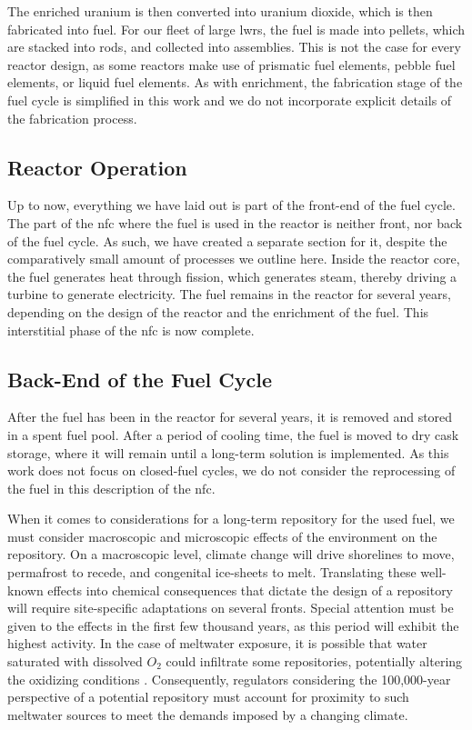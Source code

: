 The enriched uranium is then converted into uranium dioxide, which is then fabricated into fuel. For our fleet of large \glspl{lwr}, the fuel is made into pellets, which are stacked into rods, and collected into assemblies. This is not the case for every reactor design, as some reactors make use of prismatic fuel elements, pebble fuel elements, or liquid fuel elements. As with enrichment, the fabrication stage of the fuel cycle is simplified in this work and we do not incorporate explicit details of the fabrication process.

\subsection{Reactor Operation}
\label{sec:reactor_operation}
Up to now, everything we have laid out is part of the front-end of the fuel cycle. The part of the \gls{nfc} where the fuel is used in the reactor is neither front, nor back of the fuel cycle. As such, we have created a separate section for it, despite the comparatively small amount of processes we outline here. Inside the reactor core, the fuel generates heat through fission, which generates steam, thereby driving a turbine to generate electricity. The fuel remains in the reactor for several years, depending on the design of the reactor and the enrichment of the fuel. This interstitial phase of the \gls{nfc} is now complete.


\subsection{Back-End of the Fuel Cycle}
\label{sec:back_end}
After the fuel has been in the reactor for several years, it is removed and stored in a spent fuel pool. After a period of cooling time, the fuel is moved to dry cask storage, where it will remain until a long-term solution is implemented. As this work does not focus on closed-fuel cycles, we do not consider the reprocessing of the fuel in this description of the \gls{nfc}.

When it comes to considerations for a long-term repository for the used fuel, we must consider macroscopic and microscopic effects of the environment on the repository. On a macroscopic level, climate change will drive shorelines to move, permafrost to recede, and congenital ice-sheets to melt. Translating these well-known effects into chemical consequences that dictate the design of a repository will require site-specific adaptations on several fronts. Special attention must be given to the effects in the first few thousand years, as this period will exhibit the highest activity. In the case of meltwater exposure, it is possible that water saturated with dissolved $O_2$ could infiltrate some repositories, potentially altering the oxidizing conditions \cite{gurban_hydrochemical_2001}. Consequently, regulators considering the 100,000-year perspective of a potential repository must account for proximity to such meltwater sources to meet the demands imposed by a changing climate.

